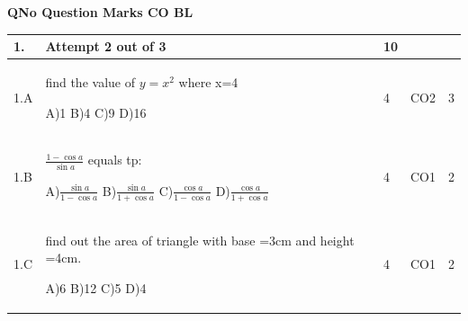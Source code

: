 \documentclass[12pt]{article}
\begin{document}
	\begin{flushleft}
	\bf{QNo}\hspace{1.2cm} \bf{Question} \hspace{5.5cm}  \bf{Marks} \hspace{0.2cm} \bf{CO} \hspace{0.2cm}	\bf{BL}	
	
\end{flushleft} 
	\begin{tabular}{|L{1cm}|L{8cm}|C{1cm}|C{1cm}|C{1cm}|}\hline
		\bf{1}. & \bf{Attempt} \bf2 \bf{out} of \bf3 & \bf10  & & \\ \hline
				1.A & find the value of   $y=x^{2}$  where x=4 \newline
					
		A)1\newline
		B)4\newline
		C)9\newline
		D)16 &
		4 &
		CO2&
		3 \\ \hline
		
				1.B & $\frac{1-\cos a}{\sin a}$  equals tp: \newline
					
		A)$\frac{\sin a}{1-\cos a}$\newline
		B)$\frac{\sin a}{1+\cos a}$\newline
		C)$\frac{\cos a}{1-\cos a}$\newline
		D)$\frac{\cos a}{1+\cos a}$ &
		4 &
		CO1&
		2 \\ \hline
		
				1.C & find out the area of triangle with base =3cm and height =4cm. \newline
					
		A)6\newline
		B)12\newline
		C)5\newline
		D)4 &
		4 &
		CO1&
		2 \\ \hline
		
		
	\end{tabular}
\end{document}
